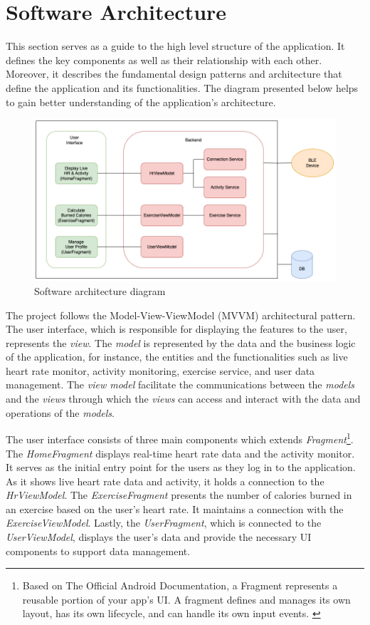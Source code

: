 \section{Software Architecture}
This section serves as a guide to the high level structure of the application. It defines the key components as well as their relationship with each other.
Moreover, it describes the fundamental design patterns and architecture that define the application and its functionalities. 
The diagram presented below helps to gain better understanding of the application's architecture.
\begin{figure}[H]
    \centering
    \includegraphics[width=1\textwidth]{diagrams/architecture-diagram.drawio.png}
    \caption{Software architecture diagram}
    \label{fig:soft_diagram}
\end{figure}
The project follows the Model-View-ViewModel (MVVM) architectural pattern. The user interface, which is responsible for displaying the features to the user, represents the \emph{view}. 
The \emph{model} is represented by the data and the business logic of the application, for instance, the entities and the functionalities such as live heart rate monitor, activity monitoring, exercise service, and user data management. 
The \emph{view model} facilitate the communications between the \emph{models} and the \emph{views} through which the \emph{views} can access and interact with the data and operations of the \emph{models}.

The user interface consists of three main components which extends \emph{Fragment}\footnote{Based on The Official Android Documentation, a Fragment represents a reusable portion of your app's UI. A fragment defines and manages its own layout, has its own lifecycle, and can handle its own input events. \autocite{android-fragments}}. 
The \emph{HomeFragment} displays real-time heart rate data and the activity monitor. It serves as the initial entry point for the users as they log in to the application. As it shows live heart rate data and activity, it holds a connection to the \emph{HrViewModel}.
The \emph{ExerciseFragment} presents the number of calories burned in an exercise based on the user's heart rate. It maintains a connection with the \emph{ExerciseViewModel}. Lastly, the \emph{UserFragment}, which is connected to the \emph{UserViewModel}, displays the user's data and provide the necessary UI components to support data management.


